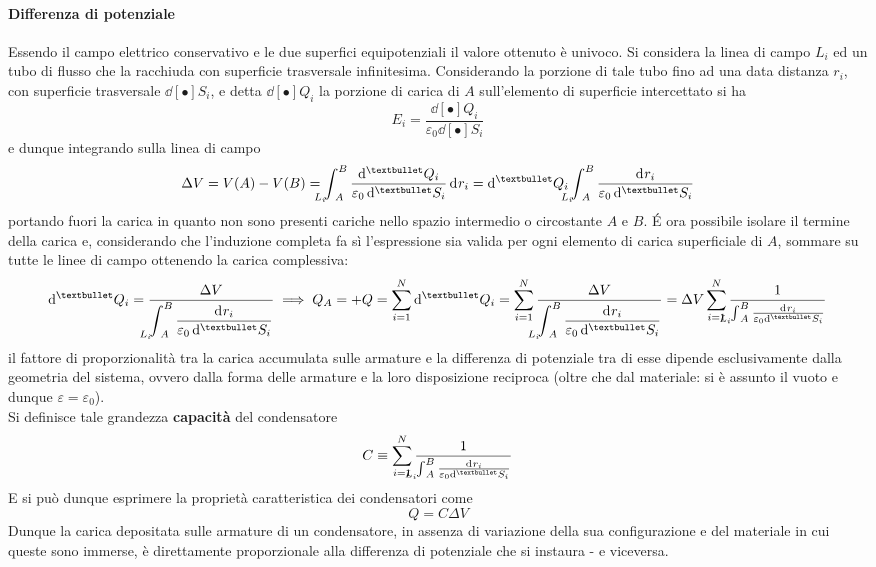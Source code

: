 \paragraph{Differenza di potenziale} Essendo il campo elettrico conservativo e le due superfici equipotenziali il valore ottenuto è univoco. Si considera la linea di campo $L_i$ ed un tubo di flusso che la racchiuda con superficie trasversale infinitesima. Considerando la porzione di tale tubo fino ad una data distanza $r_i$, con superficie trasversale $\dd[•]{S_i}$, e detta $\dd[•]{Q_i}$ la porzione di carica di $A$ sull'elemento di superficie intercettato si ha
\[E_i = \frac{\dd[•]{Q_i}}{\varepsilon_0 \dd[•]{S_i}}\]
e dunque integrando sulla linea di campo
\[\Delta V = V(A) - V(B) = \int_{\hspace{-0.45cm} L_i \hspace{0.22cm} A}^B \frac{\dd[•]{Q_i}}{\varepsilon_0 \dd[•]{S_i}} \dd[]{r_i} = \dd[•]{Q_i} \int_{\hspace{-0.45cm} L_i \hspace{0.22cm} A}^B \frac{ \dd[]{r_i}}{\varepsilon_0 \dd[•]{S_i}}\]
portando fuori la carica in quanto non sono presenti cariche nello spazio intermedio o circostante $A$ e $B$. \'E ora possibile isolare il termine della carica e, considerando che l'induzione completa fa sì l'espressione sia valida per ogni elemento di carica superficiale di $A$, sommare su tutte le linee di campo ottenendo la carica complessiva:
\[\dd[•]{Q_i} = \frac{\Delta V}{\ds \int_{\hspace{-0.45cm} L_i \hspace{0.22cm} A}^B \frac{ \dd[]{r_i}}{\varepsilon_0 \dd[•]{S_i}}} \implies Q_A = +Q = \sum\limits_{i=1}^{N} \dd[•]{Q_i} = \sum\limits_{i=1}^{N} \frac{\Delta V}{\ds \int_{\hspace{-0.45cm} L_i \hspace{0.22cm} A}^B \frac{ \dd[]{r_i}}{\varepsilon_0 \dd[•]{S_i}}} = \Delta V \sum\limits_{i=1}^{N} \frac{1}{\int_{\hspace{-0.45cm} L_i \hspace{0.22cm} A}^B \frac{ \dd[]{r_i}}{\varepsilon_0 \dd[•]{S_i}}}\]
il fattore di proporzionalità tra la carica accumulata sulle armature e la differenza di potenziale tra di esse dipende esclusivamente dalla geometria del sistema, ovvero dalla forma delle armature e la loro disposizione reciproca (oltre che dal materiale: si è assunto il vuoto e dunque $\varepsilon = \varepsilon_0$).
\\Si definisce tale grandezza \textbf{capacità} del condensatore
\[C \equiv \sum\limits_{i=1}^{N} \frac{1}{\int_{\hspace{-0.45cm} L_i \hspace{0.22cm} A}^B \frac{ \dd[]{r_i}}{\varepsilon_0 \dd[•]{S_i}}}\]
E si può dunque esprimere la proprietà caratteristica dei condensatori come
\[Q = C \Delta V \]
Dunque la carica depositata sulle armature di un condensatore, in assenza di variazione della sua configurazione e del materiale in cui queste sono immerse, è direttamente proporzionale alla differenza di potenziale che si instaura - e viceversa.

